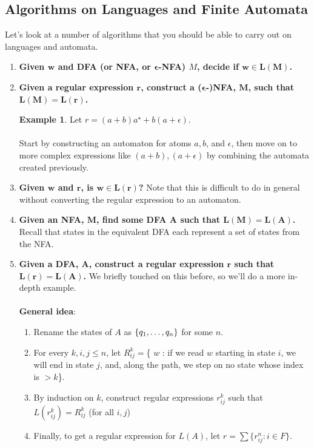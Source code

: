 \documentclass[]{article}
\DeclarePairedDelimiter{\set}{\lbrace}{\rbrace}
\theoremstyle{definition}
\newtheorem{ex}{Example}[section]
\newcommand{\lecture}[1]{\marginpar{{\footnotesize $\leftarrow$ \underline{#1}}}}
\begin{document}
      \subsection{Algorithms on Languages and Finite Automata} \lecture{October 10, 2013}
        Let's look at a number of algorithms that you should be able to carry out on languages and automata.

        \begin{enumerate}
          \item \textbf{Given $\boldsymbol{w}$ and DFA (or NFA, or $\boldsymbol{\epsilon}$-NFA) $M$, decide if $\boldsymbol{w \in L(M)}$.}
          \item \textbf{Given a regular expression $\boldsymbol{r}$, construct a ($\boldsymbol{\epsilon}$-)NFA, $\boldsymbol{M}$, such that $\boldsymbol{L(M) = L(r)}$.}
          \begin{ex}
            Let $r = (a + b) a^\star + b(a + \epsilon)$.
            \\ \\
            Start by constructing an automaton for atoms $a, b$, and $\epsilon$, then move on to more complex expressions like $(a + b), (a + \epsilon)$ by combining the automata created previously.
          \end{ex}

          \item \textbf{Given $\boldsymbol{w}$ and $\boldsymbol{r}$, is $\boldsymbol{w \in L(r)}$?} Note that this is difficult to do in general without converting the regular expression to an automaton.

          \item \textbf{Given an NFA, $\boldsymbol{M}$, find some DFA $\boldsymbol{A}$ such that $\boldsymbol{L(M) = L(A)}$.} Recall that states in the equivalent DFA each represent a set of states from the NFA.

          \item \textbf{Given a DFA, $\boldsymbol{A}$, construct a regular expression $\boldsymbol{r}$ such that $\boldsymbol{L(r) = L(A)}$.} We briefly touched on this before, so we'll do a more in-depth example.
          \\ \\
          \textbf{General idea}:
          \begin{enumerate}
            \item Rename the states of $A$ as $\set{ q_1, \ldots, q_n }$ for some $n$.
            \item For every $k, i, j \le n$, let $R_{ij}^k = $\{ $w$ : if we read $w$ starting in state $i$, we will end in state $j$, and, along the path, we step on no state whose index is $> k$\}.
            \item By induction on $k$, construct regular expressions $r_{ij}^k$ such that $L(r_{ij}^k) = R_{ij}^k$ (for all $i, j$)
            \item Finally, to get a regular expression for $L(A)$, let $r = \sum \{ r_{ij}^n : i \in F \}$.
          \end{enumerate}


\end{enumerate}
\end{document}
